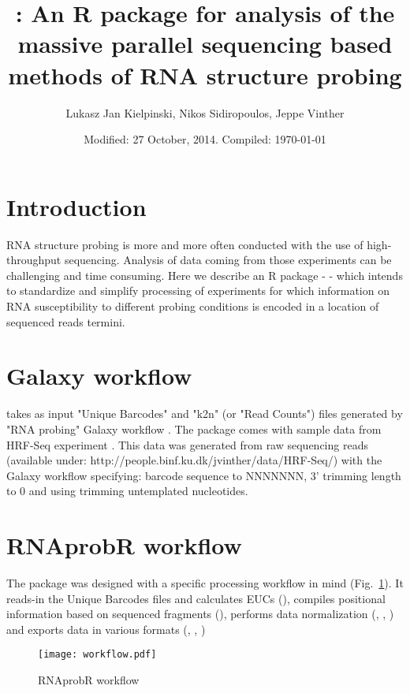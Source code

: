\documentclass{article}
\title{\Biocpkg{RNAprobR}: An R package for analysis of the massive parallel sequencing based methods of RNA structure probing}
\author{Lukasz Jan Kielpinski, Nikos Sidiropoulos, Jeppe Vinther}
\date{Modified: 27 October, 2014. Compiled: \today}
\begin{document}


\maketitle

\tableofcontents

\section{Introduction}

RNA structure probing is more and more often conducted with the use of high-throughput sequencing. Analysis of data coming from those experiments can be challenging and time consuming. Here we describe an R package -  - which intends to standardize and simplify processing of experiments for which information on RNA susceptibility to different probing conditions is encoded in a location of sequenced reads termini.

\section{Galaxy workflow}

 takes as input "Unique Barcodes" and "k2n" (or "Read Counts") files generated by "RNA probing" Galaxy workflow \cite{Goecks2010}. The package comes with sample data from HRF-Seq experiment \cite{Kielpinski2014}. This data was generated from raw sequencing reads (available under: http://people.binf.ku.dk/jvinther/data/HRF-Seq/) with the Galaxy workflow specifying: barcode sequence to NNNNNNN, 3' trimming length to 0 and using trimming untemplated nucleotides.

\section{RNAprobR workflow}

The package was designed with a specific processing workflow in mind (Fig.~\ref{fig:workflow}). It reads-in the Unique Barcodes files and calculates EUCs (), compiles positional information based on sequenced fragments (), performs data normalization (, , ) and exports data in various formats (, , )

\begin{figure}[h!]
\centering
\texttt{[image: workflow.pdf]}
\caption{RNAprobR workflow}
\label{fig:workflow}
\end{figure}
\end{document}
